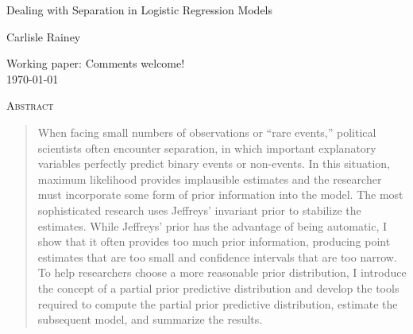 \documentclass[12pt]{article}
\begin{document}
\begin{center}
{\LARGE Dealing with Separation in Logistic Regression Models}

\vspace{10mm}

Carlisle Rainey

\end{center}

\thispagestyle{empty}

\begin{center}
\begin{footnotesize}
Working paper: Comments welcome!\\
\vspace{3mm}
\today
\end{footnotesize}
\end{center}

\vspace{10mm}
{\centerline{\textsc{Abstract}}}
\begin{quote}
\noindent When facing small numbers of observations or ``rare events,'' political scientists often encounter separation, in which important explanatory variables perfectly predict binary events or non-events. In this situation, maximum likelihood provides implausible estimates and the researcher must incorporate some form of prior information into the model. The most sophisticated research uses Jeffreys' invariant prior to stabilize the estimates. While Jeffreys' prior has the advantage of being automatic, I show that it often provides too much prior information, producing point estimates that are too small and confidence intervals that are too narrow. To help researchers choose a more reasonable prior distribution, I introduce the concept of a partial prior predictive distribution and develop the tools required to compute the partial prior predictive distribution, estimate the subsequent model, and summarize the results.
\end{quote}
\end{document}
